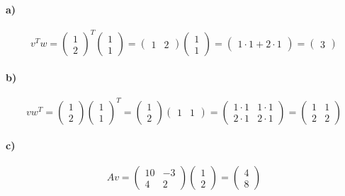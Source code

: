 \documentclass{article}
\begin{document}
\paragraph{a)}
\[v^Tw = \begin{pmatrix}1\\2\end{pmatrix}^T\begin{pmatrix}1\\1\end{pmatrix} = \begin{pmatrix}1&2\end{pmatrix}\begin{pmatrix}1\\1\end{pmatrix} = \begin{pmatrix}1\cdot1+2\cdot1\end{pmatrix} = \begin{pmatrix}3\end{pmatrix}\]
\paragraph{b)}
\[vw^T = \begin{pmatrix}1\\2\end{pmatrix}\begin{pmatrix}1\\1\end{pmatrix}^T = \begin{pmatrix}1\\2\end{pmatrix}\begin{pmatrix}1&1\end{pmatrix} = \begin{pmatrix}1\cdot1&1\cdot1\\2\cdot1&2\cdot1\end{pmatrix} = \begin{pmatrix}1&1\\2&2\end{pmatrix}\]
\paragraph{c)}
\[Av = \begin{pmatrix}10 & -3\\4&2\end{pmatrix}\begin{pmatrix}1\\2\end{pmatrix} = \begin{pmatrix}4\\8\end{pmatrix}\]
\end{document}
